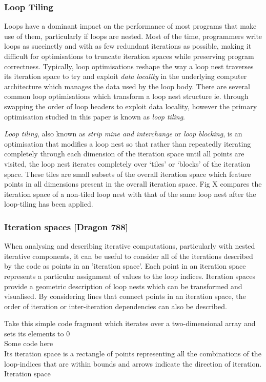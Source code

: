 \documentclass[a4paper,12pt,twoside]{report}
\begin{document}
\subsubsection{Loop Tiling}
Loops have a dominant impact on the performance of most programs that make use of them, particularly if loops are nested.
Most of the time, programmers write loops as succinctly and with as few redundant iterations as possible, making it difficult
for optimisations to truncate iteration spaces while preserving program correctness. Typically, loop optimisations reshape the
way a loop nest traverses its iteration space to try and exploit \textit{data locality} in the underlying computer architecture which
manages the data used by the loop body. There are several common loop optimisations which transform a loop nest structure ie. through
swapping the order of loop headers to exploit data locality, however the primary optimisation studied in this paper is known as
\textit{loop tiling}.

\textit{Loop tiling}, also known as \textit{strip mine and interchange} or \textit{loop blocking}, is an optimisation that modifies 
a loop nest so that rather than repeatedly iterating completely through each dimension of the iteration space until all points are
visited, the loop nest iterates completely over `tiles' or `blocks' of the iteration space. These tiles are small subsets of the overall
iteration space which feature points in all dimensions present in the overall iteration space. Fig X compares the iteration space of a non-tiled
loop nest with that of the same loop nest after the loop-tiling has been applied.

\subsubsection{Iteration spaces [Dragon 788]}
When analysing and describing iterative computations, particularly with nested iterative components, it can be useful to consider 
all of the iterations described by the code as points in an 'iteration space'. Each point in an iteration space represents a
particular assignment of values to the loop indices. Iteration spaces provide a geometric description of loop nests which can be
transformed and visualised. By considering lines that connect points in an iteration space, the order of iteration or 
inter-iteration dependencies can also be described.

Take this simple code fragment which iterates over a two-dimensional array and sets its elements to 0
\\ Some code here \\
Its iteration space is a rectangle of points representing all the combinations of the loop-indices that are within bounds and
arrows indicate the direction of iteration.
\\ Iteration space \\
\end{document}

